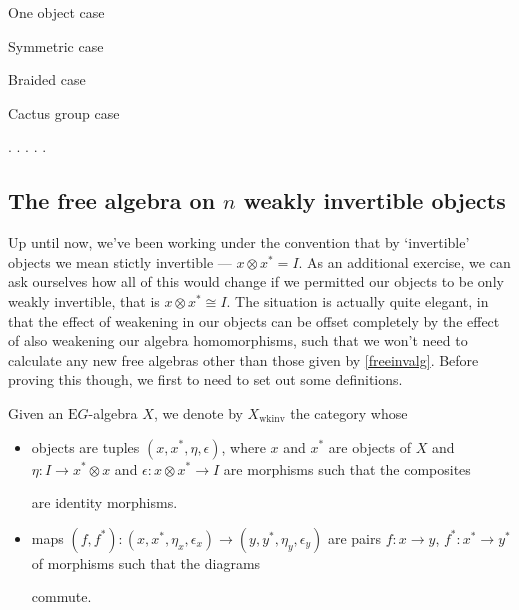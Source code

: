 \begin{prop} One object case
\end{prop}

\begin{prop} Symmetric case
\end{prop}

\begin{prop} Braided case
\end{prop}

\begin{prop} Cactus group case
\end{prop}

.
.
.
.
.


\subsection{The free algebra on $n$ weakly invertible objects}

Up until now, we've been working under the convention that by `invertible' objects we mean stictly invertible --- $x \otimes x^* = I$. As an additional exercise, we can ask ourselves how all of this would change if we permitted our objects to be only weakly invertible, that is $x \otimes x^* \cong I$. The situation is actually quite elegant, in that the effect of weakening in our objects can be offset completely by the effect of also weakening our algebra homomorphisms, such that we won't need to calculate any new free algebras other than those given by \cref{freeinvalg}. Before proving this though, we first to need to set out some definitions.

\begin{defn} Given an $\mathrm{E}G$-algebra $X$, we denote by $X_{\mathrm{wkinv}}$ the category whose
\begin{itemize}
\item objects are tuples $(x, x^*, \eta, \epsilon)$, where $x$ and $x^*$ are objects of $X$ and $\eta: I \to x^* \otimes x$ and $\epsilon : x \otimes x^* \to I$ are morphisms such that the composites
\begin{eq*}  \end{eq*}
are identity morphisms.
\item maps $(f, f^*): (x, x^*, \eta_x, \epsilon_x) \to (y, y^*, \eta_y, \epsilon_y)$ are pairs $f: x \to y$, $f^* : x^* \to y^*$ of morphisms such that the diagrams
\begin{eq*}  \end{eq*}
commute.
\end{itemize}
\end{defn}

